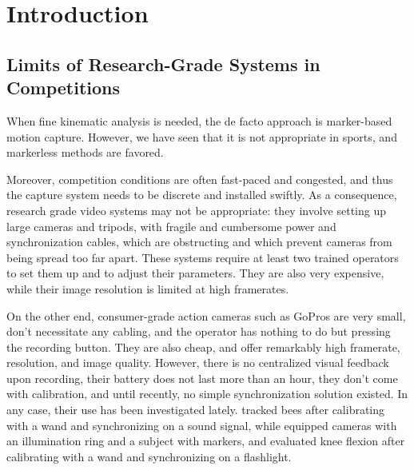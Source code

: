 \newpage

\section{Introduction}

\subsection{Limits of Research-Grade Systems in Competitions}

When fine kinematic analysis is needed, the de facto approach is marker-based motion capture. However, we have seen that it is not appropriate in sports, and markerless methods are favored.


Moreover, competition conditions are often fast-paced and congested, and thus the capture system needs to be discrete and installed swiftly. As a consequence, research grade video systems may not be appropriate: they involve setting up large cameras and tripods, with fragile and cumbersome power and synchronization cables, which are obstructing and which prevent cameras from being spread too far apart. These systems require at least two trained operators to set them up and to adjust their parameters. They are also very expensive, while their image resolution is limited at high framerates. 

On the other end, consumer-grade action cameras such as GoPros are very small, don't necessitate any cabling, and the operator has nothing to do but pressing the recording button. They are also cheap, and offer remarkably high framerate, resolution, and image quality. However, there is no centralized visual feedback upon recording, their battery does not last more than an hour, they don't come with calibration, and until recently, no simple synchronization solution existed. In any case, their use has been investigated lately. \cite{Jackson2016} tracked bees after calibrating with a wand and synchronizing on a sound signal, while \cite{Dalla2019} equipped cameras with an illumination ring and a subject with markers, and evaluated knee flexion after calibrating with a wand and synchronizing on a flashlight.

